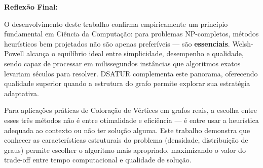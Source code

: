 \documentclass[12pt]{article}
\begin{document}
\textbf{Reflexão Final:}

O desenvolvimento deste trabalho confirma empiricamente um princípio fundamental em Ciência da Computação: para problemas NP-completos, métodos heurísticos bem projetados não são apenas preferíveis — são \textbf{essenciais}. Welsh-Powell alcança o equilíbrio ideal entre simplicidade, desempenho e qualidade, sendo capaz de processar em milissegundos instâncias que algoritmos exatos levariam séculos para resolver. DSATUR complementa este panorama, oferecendo qualidade superior quando a estrutura do grafo permite explorar sua estratégia adaptativa. 

Para aplicações práticas de Coloração de Vértices em grafos reais, a escolha entre esses três métodos não é entre otimalidade e eficiência — é entre usar a heurística adequada ao contexto ou não ter solução alguma. Este trabalho demonstra que conhecer as características estruturais do problema (densidade, distribuição de graus) permite escolher o algoritmo mais apropriado, maximizando o valor do trade-off entre tempo computacional e qualidade de solução.
\newpage


\end{document}
